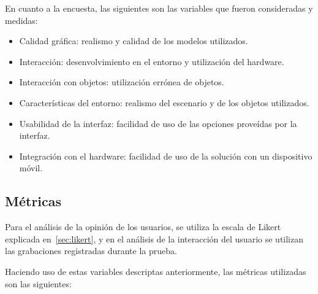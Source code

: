 En cuanto a la encuesta, las siguientes son las variables que fueron consideradas y medidas:

\begin{itemize}

\item Calidad gráfica: realismo y calidad de los modelos utilizados.

\item Interacción: desenvolvimiento en el entorno y utilización del hardware.

\item Interacción con objetos: utilización errónea de objetos.

\item Características del entorno: realismo del escenario y de los objetos
    utilizados.

\item Usabilidad de la interfaz: facilidad de uso de las opciones proveídas por
    la interfaz.

\item Integración con el hardware: facilidad de uso de la solución con un dispositivo móvil. 

\end{itemize}

\subsection{Métricas}

Para el análisis de la opinión de los usuarios, se utiliza la escala de Likert
explicada en~\ref{sec:likert}, y en el análisis de la interacción del usuario se
utilizan las grabaciones registradas durante la prueba.

Haciendo uso de estas variables descriptas anteriormente, las métricas
utilizadas son las siguientes:

